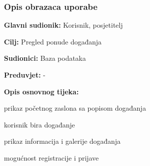 				\subsubsection{Opis obrazaca uporabe}
					

					\noindent {}
					\begin{packed_item}
	
						\item \textbf{Glavni sudionik: }Korisnik, posjetitelj
						\item  \textbf{Cilj:} Pregled ponude događanja
						\item  \textbf{Sudionici:} Baza podataka
						\item  \textbf{Preduvjet:} -
						\item  \textbf{Opis osnovnog tijeka:}
						
						\item[] \begin{packed_enum}
	
							\item prikaz početnog zaslona sa popisom događanja
							\item korisnik bira događanje 
							\item prikaz informacija i galerije događanja
							\item mogućnost registracije i prijave
						\end{packed_enum}
						
					\end{packed_item}
					
